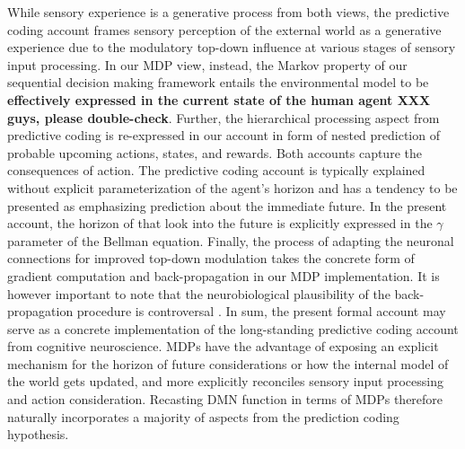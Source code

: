 \documentclass[10pt,letterpaper]{article}
\newcommand{\suggestremove}[1]{{\color{red} \sout{#1}}}
\begin{document}
While sensory experience is a generative process from both views,
the predictive coding account frames
sensory perception of the external world
as a generative experience due to the modulatory top-down influence at
various stages of sensory input processing.
In our MDP view, instead,
the Markov property of our sequential decision making framework entails
the environmental model to be
\textbf{effectively expressed in the current state of the human agent
XXX guys, please double-check}.
Further,
the hierarchical processing aspect from predictive coding
is re-expressed in our account in form of
nested prediction of probable upcoming actions, states, and rewards.
Both accounts capture the consequences of action.
The predictive coding account is typically explained without
explicit parameterization of the agent's horizon and
has a tendency to be presented as emphasizing prediction about the
immediate future.
In the present account, the horizon of that
look into the future is explicitly expressed in the $\gamma$ parameter
of the Bellman equation.
Finally,
the process of adapting the neuronal connections
for improved top-down modulation
takes the concrete form of gradient computation and
back-propagation in our MDP implementation.
It is however important to note that
the neurobiological plausibility of
the back-propagation procedure is controversal
\citep{goodfellow2016deep}.
In sum,
the present formal account may serve as a concrete implementation of
the long-standing predictive coding account from cognitive neuroscience.
MDPs have the advantage of exposing an explicit
mechanism for the horizon of future considerations or
how the internal model of the world gets updated,
and
more explicitly reconciles sensory input processing and action consideration.
%
Recasting DMN function in terms of MDPs therefore naturally incorporates
a majority of aspects from the prediction coding hypothesis.
\end{document}
